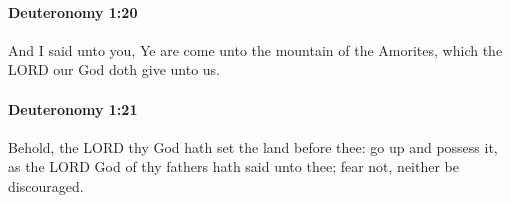 		\paragraph{Deuteronomy 1:20} %
			\label{DEUTERONOMY-1-20}

			And I said unto you, Ye are come unto the mountain of the Amorites, which the LORD our God doth give unto us.


		\paragraph{Deuteronomy 1:21} %
			\label{DEUTERONOMY-1-21}

			Behold, the LORD thy God hath set the land before thee: go up and possess it, as the LORD God of thy fathers hath said unto thee; fear not, neither be discouraged.


